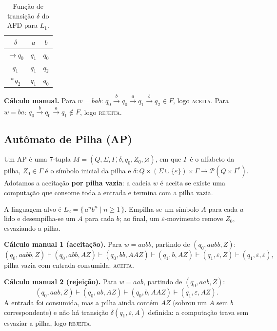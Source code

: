 \documentclass[12pt,a4paper]{article}
\begin{document}
\begin{table}[h]
\centering
\caption{Função de transição $\delta$ do AFD para $L_1$.}
\label{tab:afd}
\begin{tabular}{c|cc}
\toprule
$\delta$ & $a$ & $b$ \\
\midrule
$\rightarrow q_0$ & $q_1$ & $q_0$ \\
$q_1$             & $q_1$ & $q_2$ \\
$*\,q_2$          & $q_1$ & $q_0$ \\
\bottomrule
\end{tabular}
\end{table}

\noindent\textbf{Cálculo manual.} Para $w = bab$:
$q_0 \xrightarrow{b} q_0 \xrightarrow{a} q_1 \xrightarrow{b} q_2 \in F$, logo
\textsc{aceita}. Para $w = ba$:
$q_0 \xrightarrow{b} q_0 \xrightarrow{a} q_1 \notin F$, logo \textsc{rejeita}.

\subsection{Autômato de Pilha (AP)}
Um AP é uma 7-tupla $M = (Q, \Sigma, \Gamma, \delta, q_0, Z_0, \varnothing)$, em
que $\Gamma$ é o alfabeto da pilha, $Z_0 \in \Gamma$ é o símbolo inicial da pilha
e $\delta: Q \times (\Sigma \cup \{\varepsilon\}) \times \Gamma \to
\mathcal{P}(Q \times \Gamma^*)$. Adotamos a aceitação \textbf{por pilha vazia}: a
cadeia $w$ é aceita se existe uma computação que consome toda a entrada e termina
com a pilha vazia.

A linguagem-alvo é $L_2 = \{\, a^n b^n \mid n \geq 1 \,\}$. Empilha-se um símbolo
$A$ para cada $a$ lido e desempilha-se um $A$ para cada $b$; ao final, um
$\varepsilon$-movimento remove $Z_0$, esvaziando a pilha.

\noindent\textbf{Cálculo manual 1 (aceitação).} Para $w = aabb$, partindo de $(q_0, aabb, Z)$:
\[
(q_0, aabb, Z) \vdash (q_0, abb, AZ) \vdash (q_0, bb, AAZ) \vdash (q_1, b, AZ)
\vdash (q_1, \varepsilon, Z) \vdash (q_1, \varepsilon, \varepsilon),
\]
pilha vazia com entrada consumida: \textsc{aceita}.

\noindent\textbf{Cálculo manual 2 (rejeição).} Para $w = aab$, partindo de $(q_0, aab, Z)$:
\[
(q_0, aab, Z) \vdash (q_0, ab, AZ) \vdash (q_0, b, AAZ) \vdash (q_1, \varepsilon, AZ).
\]
A entrada foi consumida, mas a pilha ainda contém $AZ$ (sobrou um $A$ sem $b$
correspondente) e não há transição $\delta(q_1, \varepsilon, A)$ definida: a
computação trava sem esvaziar a pilha, logo \textsc{rejeita}.
\end{document}
